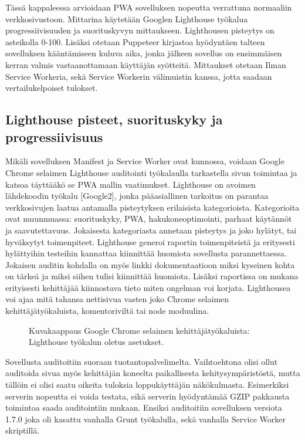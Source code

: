 \documentclass{tktltiki}
\begin{document}
Tässä kappaleessa arvioidaan PWA sovelluksen nopeutta verrattuna normaaliin verkkosivustoon. Mittarina käytetään Googlen Lighthouse työkalua progressiivisuuden ja suorituskyvyn mittaukseen. Lighthousen pisteytys on asteikolla 0-100. Lisäksi otetaan Puppeteer kirjastoa hyödyntäen talteen sovelluksen kääntämiseen kuluva aika, jonka jälkeen sovellus on ensimmäisen kerran valmis vastaanottamaan käyttäjän syötteitä. Mittaukset otetaan Ilman Service Workeria, sekä Service Workerin välimuistin kanssa, jotta saadaan vertailukelpoiset tulokset.

\subsection{Lighthouse pisteet, suorituskyky ja progressiivisuus}

Mikäli sovelluksen Manifest ja Service Worker ovat kunnossa, voidaan Google Chrome selaimen Lighthouse auditointi työkalaulla tarkastella sivun toimintaa ja katsoa täyttääkö se PWA mallin vaatimukset. Lighthouse on avoimen lähdekoodin työkalu [Google2], jonka pääasiallinen tarkoitus on parantaa verkkosivujen laatua antamalla pisteytyksen erilaisista kategorioista. Kategorioita ovat muunmuassa: suorituskyky, PWA, hakukoneoptimointi, parhaat käytännöt ja saavutettavuus. Jokaisesta kategoriasta annetaan pisteytys ja joko hylätyt, tai hyväksytyt toimenpiteet. Lighthouse generoi raportin toimenpiteistä ja eritysesti hylättyihin testeihin kannattaa kiinnittää huomiota sovellusta parannettaessa. Jokaisen auditin kohdalla on myös linkki dokumentaatioon miksi kyseinen kohta on tärkeä ja miksi siihen tulisi kiinnittää huomiota. Lisäksi raportissa on mukana erityisesti kehittäjää kiinnostava tieto miten ongelman voi korjata. Lighthousea voi ajaa mitä tahansa nettisivua vasten joko Chrome selaimen kehittäjätyökaluista, komentoriviltä tai node moduulina.

\begin{figure}[h]
\begin{center}
\caption{Kuvakaappaus Google Chrome selaimen kehittäjätyökaluista: Lighthouse työkalun oletus asetukset.}
\label{Lighthouse}
\end{center}
\end{figure}

\clearpage

Sovellusta auditoitiin suoraan tuotantopalvelimelta. Vaihtoehtona olisi ollut auditoida sivua myös kehittäjän koneelta paikallisesta kehitysympäristöstä, mutta tällöin ei olisi saatu oikeita tuloksia loppukäyttäjän näkökulmasta. Esimerkiksi serverin nopeutta ei voida testata, eikä serverin hyödyntämää GZIP pakkausta toimintoa saada auditointiin mukaan. Ensiksi auditoitiin sovelluksen versiota 1.7.0 joka oli kasattu vanhalla Grunt työkalulla, sekä vanhalla Service Worker skriptillä. 
\end{document}
